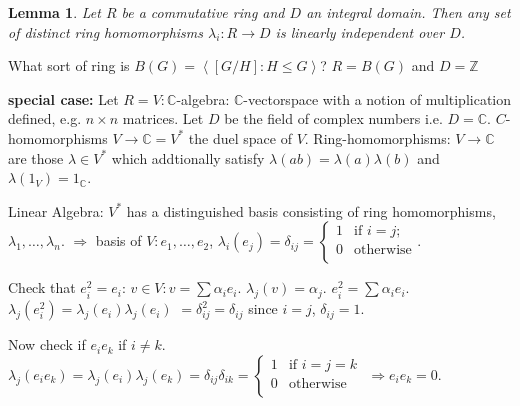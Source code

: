 \documentclass[12pt]{amsart}
\newtheorem{lemma}[theorem]{Lemma}
\theoremstyle{definition}
\begin{document}
\begin{lemma}
Let $R$ be a commutative ring and $D$ an integral domain.  Then any set of distinct ring homomorphisms $\lambda_i:R\rightarrow D$ is linearly independent over $D$.
\end{lemma}

What sort of ring is $B(G) = \left\langle [G/H] : H \leq G \right\rangle$?
$R = B(G)$ and $D = \mathbb{Z}$

\textbf{special case:}
Let $R = V: \mathbb{C}$-algebra: $\mathbb{C}$-vectorspace with a notion of multiplication defined, e.g. $n \times n$ matrices.
Let $D$ be the field of complex numbers i.e. $D = \mathbb{C}$. $C$-homomorphisms $V \rightarrow \mathbb{C} = V^{\ast}$ the duel space of $V$. Ring-homomorphisms: $V \rightarrow \mathbb{C}$ are those $\lambda \in V^{\ast}$ which addtionally satisfy $\lambda (ab) = \lambda(a) \lambda(b)$ and $\lambda(1_{V}) = 1_{\mathbb{C}}$.

Linear Algebra: $V^{\ast}$ has a distinguished basis consisting of ring homomorphisms, $\lambda_{1}, \ldots, \lambda_{n}$. $\Rightarrow$ basis of $V: e_{1}, \ldots, e_{2}$, $\lambda_{i} (e_{j}) = \delta_{ij} = \begin{cases}
                                                                                                                                             1 & \mbox{if } i = j;\\
                                                                                                                                             0 & \mbox{otherwise}\\
                                                                                                                                          \end{cases}.$

Check that $e_{i}^{2} = e_{i}$:
$v \in V: v = \sum{\alpha_{i}}{e_{i}}.$
$\lambda_{j} (v) = \alpha_{j}.$
$e_{i}^{2} = \sum{\alpha_{i}}{e_{i}}.$
$\lambda_{j} (e_{i}^{2}) = \lambda_{j} (e_{i}) \lambda_{j} (e_{i})$
$ = \delta_{ij}^{2} = \delta_{ij}$ since $i = j$, $\delta_{ij} = 1.$

Now check if $e_{i} e_{k}$ if $i \neq k$.
$\lambda_{j} (e_{i} e_{k}) = \lambda_{j} (e_{i}) \lambda_{j} (e_{k}) = \delta_{ij} \delta_{ik} = \begin{cases}
                                                                                                                                                            1 & \mbox{if } i = j= k\\
                                                                                                                                                            0 &\mbox{otherwise}\\
                                                                                                                                                         \end{cases}$
$\Rightarrow e_{i} e_{k} = 0$.
\end{document}
